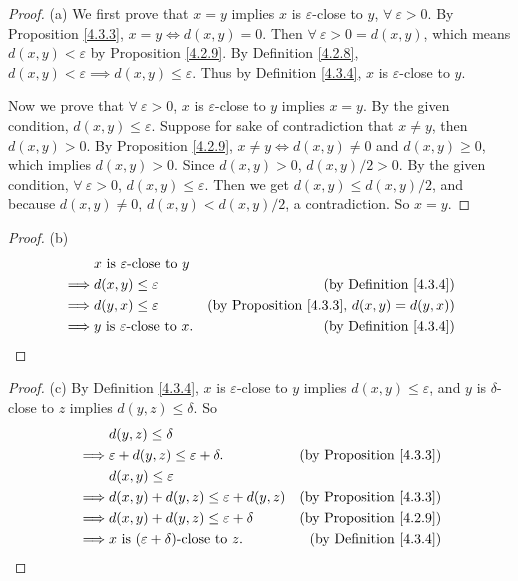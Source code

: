 \begin{proof}{(a)}
We first prove that \(x = y\) implies \(x\) is \(\varepsilon\)-close to \(y\), \(\forall\ \varepsilon > 0\).
By Proposition \ref{4.3.3}, \(x = y \iff d(x, y) = 0\).
Then \(\forall\ \varepsilon > 0 = d(x, y)\), which means \(d(x, y) < \varepsilon\) by Proposition \ref{4.2.9}.
By Definition \ref{4.2.8}, \(d(x, y) < \varepsilon \implies d(x, y) \leq \varepsilon\).
Thus by Definition \ref{4.3.4}, \(x\) is \(\varepsilon\)-close to \(y\).

Now we prove that \(\forall\ \varepsilon > 0\), \(x\) is \(\varepsilon\)-close to \(y\) implies \(x = y\).
By the given condition, \(d(x, y) \leq \varepsilon\).
Suppose for sake of contradiction that \(x \neq y\), then \(d(x, y) > 0\).
By Proposition \ref{4.2.9}, \(x \neq y \iff d(x, y) \neq 0\) and \(d(x, y) \geq 0\), which implies \(d(x, y) > 0\).
Since \(d(x, y) > 0\), \(d(x, y) / 2 > 0\).
By the given condition, \(\forall\ \varepsilon > 0\), \(d(x, y) \leq \varepsilon\).
Then we get \(d(x, y) \leq d(x, y) / 2\), and because \(d(x, y) \neq 0\), \(d(x, y) < d(x, y) / 2\), a contradiction.
So \(x = y\).
\end{proof}

\begin{proof}{(b)}
\begin{align*}
& x \text{ is \(\varepsilon\)-close to } y \\
\implies & d(x, y) \leq \varepsilon & \text{(by Definition \ref{4.3.4})} \\
\implies & d(y, x) \leq \varepsilon & \text{(by Proposition \ref{4.3.3}, \(d(x, y) = d(y, x)\))} \\
\implies & y \text{ is \(\varepsilon\)-close to } x. & \text{(by Definition \ref{4.3.4})}
\end{align*}
\end{proof}

\begin{proof}{(c)}
By Definition \ref{4.3.4}, \(x\) is \(\varepsilon\)-close to \(y\) implies \(d(x, y) \leq \varepsilon\), and \(y\) is \(\delta\)-close to \(z\) implies \(d(y, z) \leq \delta\).
So
\begin{align*}
& d(y, z) \leq \delta \\
\implies & \varepsilon + d(y, z) \leq \varepsilon + \delta. & \text{(by Proposition \ref{4.3.3})} \\
& d(x, y) \leq \varepsilon \\
\implies & d(x, y) + d(y, z) \leq \varepsilon + d(y, z) & \text{(by Proposition \ref{4.3.3})} \\
\implies & d(x, y) + d(y, z) \leq \varepsilon + \delta & \text{(by Proposition \ref{4.2.9})} \\
\implies & x \text{ is \((\varepsilon + \delta)\)-close to } z. & \text{(by Definition \ref{4.3.4})}
\end{align*}
\end{proof}

